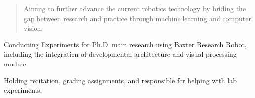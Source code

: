 \begin{quote}
Aiming to further advance the current robotics technology by briding the gap between research and practice through machine learning and computer vision.
\end{quote}

\divider


\smallskip


\divider\smallskip

\smallskip


\divider


\divider

\divider

\divider



Conducting Experiments for Ph.D. main research using Baxter Research Robot, including the integration of developmental architecture and visual processing module.

\divider

Holding recitation, grading assignments, and responsible for helping with lab experiments.

\divider

